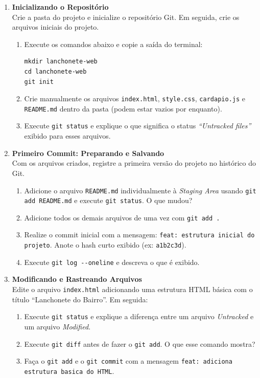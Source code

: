 \documentclass[12pt]{article}
\begin{document}
\begin{enumerate}[label=\textbf{Questão \arabic*:}, leftmargin=1.5cm, labelsep=0.5cm]

    \item \textbf{Inicializando o Repositório} \\
    Crie a pasta do projeto e inicialize o repositório Git. Em seguida, crie os arquivos iniciais do projeto.
    \begin{enumerate}[label=\alph*)]
        \item Execute os comandos abaixo e copie a saída do terminal:
\begin{lstlisting}
mkdir lanchonete-web
cd lanchonete-web
git init
\end{lstlisting}
        \item Crie manualmente os arquivos \texttt{index.html}, \texttt{style.css}, \texttt{cardapio.js} e \texttt{README.md} dentro da pasta (podem estar vazios por enquanto).
        \item Execute \texttt{git status} e explique o que significa o status \textit{``Untracked files''} exibido para esses arquivos.
    \end{enumerate}

    \item \textbf{Primeiro Commit: Preparando e Salvando} \\
    Com os arquivos criados, registre a primeira versão do projeto no histórico do Git.
    \begin{enumerate}[label=\alph*)]
        \item Adicione o arquivo \texttt{README.md} individualmente à \textit{Staging Area} usando \texttt{git add README.md} e execute \texttt{git status}. O que mudou?
        \item Adicione todos os demais arquivos de uma vez com \texttt{git add .}
        \item Realize o commit inicial com a mensagem: \texttt{feat: estrutura inicial do projeto}. Anote o hash curto exibido (ex: \texttt{a1b2c3d}).
        \item Execute \texttt{git log -{-}oneline} e descreva o que é exibido.
    \end{enumerate}

    \item \textbf{Modificando e Rastreando Arquivos} \\
    Edite o arquivo \texttt{index.html} adicionando uma estrutura HTML básica com o título ``Lanchonete do Bairro''. Em seguida:
    \begin{enumerate}[label=\alph*)]
        \item Execute \texttt{git status} e explique a diferença entre um arquivo \textit{Untracked} e um arquivo \textit{Modified}.
        \item Execute \texttt{git diff} antes de fazer o \texttt{git add}. O que esse comando mostra?
        \item Faça o \texttt{git add} e o \texttt{git commit} com a mensagem \texttt{feat: adiciona estrutura basica do HTML}.
    \end{enumerate}


\end{enumerate}
\end{document}
